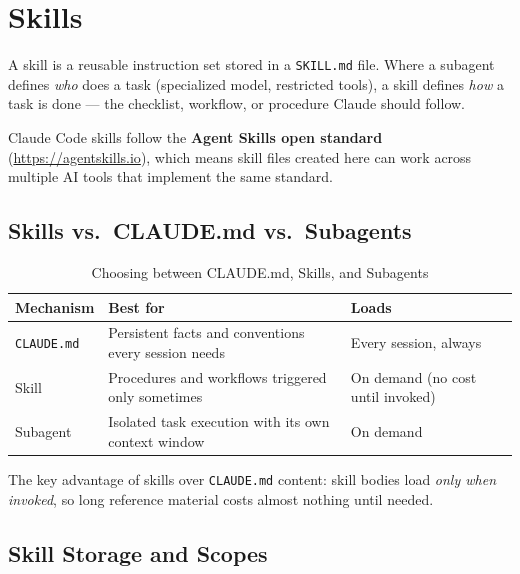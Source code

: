 \chapter{Skills}
\label{ch:skills}


A skill is a reusable instruction set stored in a \texttt{SKILL.md} file.
Where a subagent defines \emph{who} does a task (specialized model, restricted
tools), a skill defines \emph{how} a task is done — the checklist, workflow,
or procedure Claude should follow.

Claude Code skills follow the \textbf{Agent Skills open standard}
(\url{https://agentskills.io}), which means skill files created here can work
across multiple AI tools that implement the same standard.

\section{Skills vs.\ CLAUDE.md vs.\ Subagents}
\label{sec:skill-comparison}

\begin{table}[ht]
\centering
\caption{Choosing between CLAUDE.md, Skills, and Subagents}
\label{tab:skill-vs}
\begin{tabularx}{\textwidth}{lXX}
\toprule
\textbf{Mechanism} & \textbf{Best for} & \textbf{Loads} \\
\midrule
\texttt{CLAUDE.md}    & Persistent facts and conventions every session needs
                      & Every session, always \\
Skill                 & Procedures and workflows triggered only sometimes
                      & On demand (no cost until invoked) \\
Subagent              & Isolated task execution with its own context window
                      & On demand \\
\bottomrule
\end{tabularx}
\end{table}

The key advantage of skills over \texttt{CLAUDE.md} content: skill bodies load
\emph{only when invoked}, so long reference material costs almost nothing until
needed.

\section{Skill Storage and Scopes}
\label{sec:skill-scopes}


